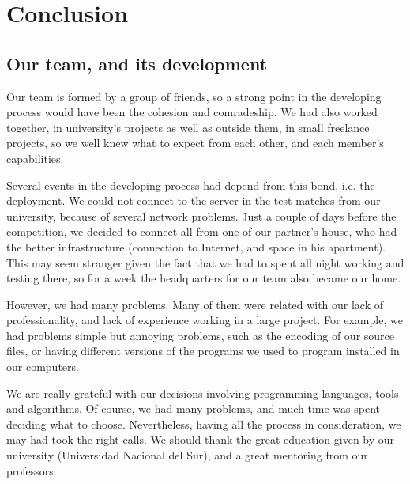 \documentclass{llncs2e/llncs}
\begin{document}
\section{Conclusion}

\subsection{Our team, and its development}
    
    Our team is formed by a group of friends, so a strong point in the developing 
    process would have been the cohesion and comradeship. We had also worked 
    together, in university's projects as well as outside them, in small freelance 
    projects, so we well knew what to expect from each other, and each member's 
    capabilities. 

    Several events in the developing process had depend from this bond, i.e. the 
    deployment. We could not connect to the server in the test matches from our 
    university, because of several network problems. Just a couple of days before 
    the competition, we decided to connect all from one of our partner's house, 
    who had the better infrastructure (connection to Internet, and space in his 
    apartment). This may seem stranger given the fact that we had to spent all 
    night working and testing there, so for a week the headquarters for our team 
    also became our home.

    However, we had many problems. Many of them were related with our lack of 
    professionality, and lack of experience working in a large project. 
    For example, we had problems simple but annoying problems, such as the 
    encoding of our source files, or having different versions of the programs 
    we used to program installed in our computers.

    We are really grateful with our decisions involving programming languages, 
    tools and algorithms. Of course, we had many problems, and much time was spent 
    deciding what to choose. Nevertheless, having all the process in 
    consideration, we may had took the right calls. We should thank the great 
    education given by our university (Universidad Nacional del Sur), and a 
    great mentoring from our professors.
\end{document}

